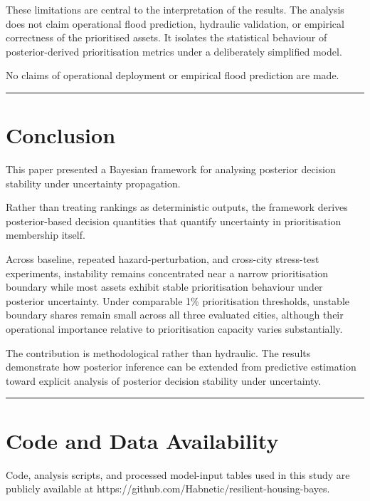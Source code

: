 \documentclass[
]{article}
\begin{document}
These limitations are central to the interpretation of the results. The
analysis does not claim operational flood prediction, hydraulic
validation, or empirical correctness of the prioritised assets. It
isolates the statistical behaviour of posterior-derived prioritisation
metrics under a deliberately simplified model.

No claims of operational deployment or empirical flood prediction are
made.

\begin{center}\rule{0.5\linewidth}{0.5pt}\end{center}

\section{Conclusion}\label{conclusion}

This paper presented a Bayesian framework for analysing posterior
decision stability under uncertainty propagation.

Rather than treating rankings as deterministic outputs, the framework
derives posterior-based decision quantities that quantify uncertainty in
prioritisation membership itself.

Across baseline, repeated hazard-perturbation, and cross-city
stress-test experiments, instability remains concentrated near a narrow
prioritisation boundary while most assets exhibit stable prioritisation
behaviour under posterior uncertainty. Under comparable 1\%
prioritisation thresholds, unstable boundary shares remain small across
all three evaluated cities, although their operational importance
relative to prioritisation capacity varies substantially.

The contribution is methodological rather than hydraulic. The results
demonstrate how posterior inference can be extended from predictive
estimation toward explicit analysis of posterior decision stability
under uncertainty.

\begin{center}\rule{0.5\linewidth}{0.5pt}\end{center}

\section{Code and Data Availability}\label{code-and-data-availability}

Code, analysis scripts, and processed model-input tables used in this
study are publicly available at
https://github.com/Habnetic/resilient-housing-bayes.
\end{document}
